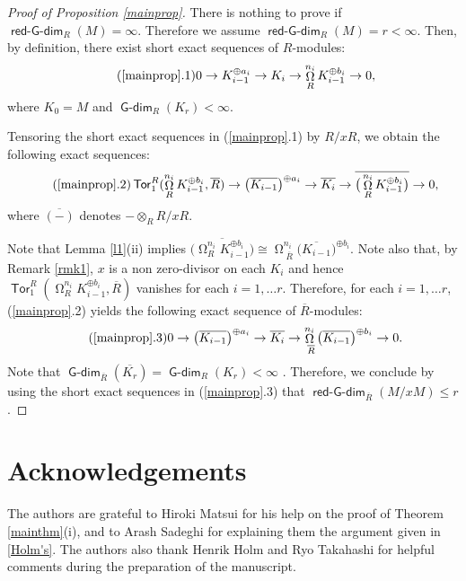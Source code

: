 \documentclass{amsart}
\theoremstyle{plain} %
\theoremstyle{definition}
\def\Tor{\operatorname{\mathsf{Tor}}}
\DeclareMathOperator{\Gdim}{\mathsf{G-dim}}
\DeclareMathOperator{\rGdim}{\operatorname{\mathsf{red-G-dim}}}
\DeclareMathOperator{\syz}{\Omega}
\begin{document}
\begin{proof} [Proof of Proposition \ref{mainprop}] There is nothing to prove if $\rGdim_R(M)=\infty$. Therefore we assume $\rGdim_R(M)=r<\infty$. Then, by definition, there exist short exact sequences of $R$-modules:
\begin{equation} \tag{\ref{mainprop}.1}
0 \to K_{i-1}^{\oplus a_i} \to K_i \to \syz^{n_i}_R K_{i-1}^{\oplus b_i} \to 0,
\end{equation}
where $K_0=M$ and $\Gdim_R(K_r)<\infty$.

Tensoring the short exact sequences in (\ref{mainprop}.1) by $R/xR$, we obtain the following exact sequences:
\begin{equation} \tag{\ref{mainprop}.2}
\Tor_1^R(\syz^{n_i}_R K_{i-1}^{\oplus b_i},\overline{R}) \to \big(\overline{K_{i-1}}\big)^{\oplus a_i} \to \overline{K_i} \to \overline{\big(\syz^{n_i}_R K_{i-1}^{\oplus b_i}\big)} \to 0,
\end{equation}
where $\overline{(-)}$ denotes $-\otimes_R R/xR$. 

Note that Lemma \ref{l1}(ii) implies $\overline{\big(\syz^{n_i}_R K_{i-1}^{\oplus b_i}\big)} \cong \syz^{n_i}_{\; \overline{R}} \big(\overline{K_{i-1}}\big)^{\oplus b_i}$. Note also that, by Remark \ref{rmk1}, $x$ is a non zero-divisor on each $K_i$ and hence $\Tor_1^R(\syz^{n_i}_R K_{i-1}^{\oplus b_i},\overline{R})$ vanishes for each $i=1, \ldots r$. Therefore, for each $i=1, \ldots r$, (\ref{mainprop}.2) yields the following exact sequence of $\overline{R}$-modules:
\begin{equation} \tag{\ref{mainprop}.3}
0 \to \big(\overline{K_{i-1}}\big)^{\oplus a_i} \to \overline{K_i} \to \syz^{n_i}_{\; \overline{R}} \big(\overline{K_{i-1}}\big)^{\oplus b_i} \to 0.
\end{equation}
Note that $\Gdim_{\overline{R}}(\overline{K_r})=\Gdim_R(K_r)<\infty$ \cite[1.4.5]{Gdimbook}. Therefore, we conclude by using the short exact sequences in (\ref{mainprop}.3) that $\rGdim_{\overline{R}}(M/xM)\leq r$.
\end{proof}

\section*{Acknowledgements}
The authors are grateful to Hiroki Matsui for his help on the proof of Theorem \ref{mainthm}(i), and to Arash Sadeghi for explaining them the argument given in \ref{Holm's}. The authors also thank Henrik Holm and Ryo Takahashi for helpful comments during the preparation of the manuscript.
\end{document}
